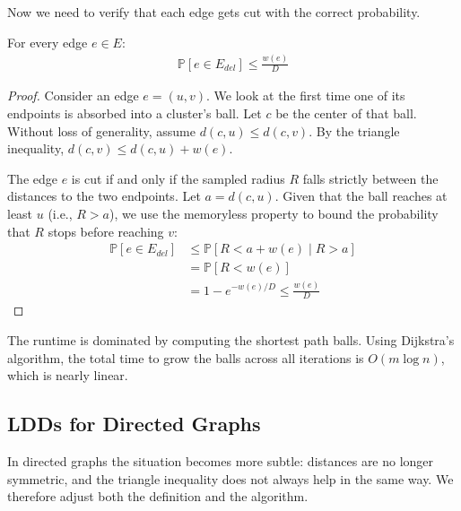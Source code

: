Now we need to verify that each edge gets cut with the correct probability.

\begin{lema}
    For every edge $e \in E$:
    \begin{align*}
        \mathbb{P}[e \in E_{del}] \leq \frac{w(e)}{D}
    \end{align*}
\end{lema}
\begin{proof}
    Consider an edge $e = (u,v)$. We look at the first time one of its endpoints is absorbed into a cluster's ball. Let $c$ be the center of that ball. Without loss of generality, assume $d(c, u) \leq d(c, v)$. By the triangle inequality, $d(c, v) \leq d(c, u) + w(e)$.
    
    The edge $e$ is cut if and only if the sampled radius $R$ falls strictly between the distances to the two endpoints. Let $a = d(c, u)$. Given that the ball reaches at least $u$ (i.e., $R > a$), we use the memoryless property to bound the probability that $R$ stops before reaching $v$:
    \begin{align*}
        \mathbb{P}[e \in E_{del}] &\leq \mathbb{P}[R < a + w(e) \mid R > a] \\
        &= \mathbb{P}[R < w(e)] \\
        &= 1 - e^{-w(e)/D} \leq \frac{w(e)}{D}
    \end{align*}
\end{proof}

The runtime is dominated by computing the shortest path balls. Using Dijkstra's algorithm, the total time to grow the balls across all iterations is $O(m \log n)$, which is nearly linear.


\subsection{LDDs for Directed Graphs}

In directed graphs the situation becomes more subtle: distances are no longer symmetric, and the triangle inequality does not always help in the same way. We therefore adjust both the definition and the algorithm.

